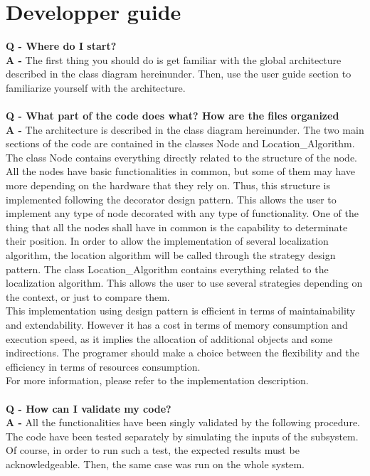 \documentclass[a4paper,10pt]{article}
\begin{document}
\section{Developper guide}
\textbf{Q - Where do I start?} \\
\textbf{A - }The first thing you should do is get familiar with the global architecture described in the class diagram hereinunder. Then, use the 
user guide section to familiarize yourself with the architecture.
\\ \\
\textbf{Q - What part of the code does what? How are the files organized} \\
\textbf{A - }The architecture is described in the class diagram hereinunder. The two main sections of the code are contained in the classes Node and 
Location\_Algorithm. \\
The class Node contains everything directly related to the structure of the node. All the nodes have basic functionalities in common, but
some of them may have more depending on the hardware that they rely on. Thus, this structure is implemented following the decorator design pattern. 
This allows the user to implement any type of node decorated with any type of functionality. One of the thing that all the nodes shall have in
common is the capability to determinate their position. In order to allow the implementation of several localization algorithm, the location algorithm
will be called through the strategy design pattern. The class Location\_Algorithm contains everything related to the localization algorithm. This
allows the user to use several strategies depending on the context, or just to compare them.\\
This implementation using design pattern is efficient in terms of maintainability and extendability. However it has a cost in terms of memory 
consumption and execution speed, as it implies the allocation of additional objects and some indirections. The programer should make a choice
between the flexibility and the efficiency in terms of resources consumption.	\\
For more information, please refer to the implementation description.
\\ \\
\textbf{Q - How can I validate my code?} \\
\textbf{A - }All the functionalities have been singly validated by the following procedure. The code have been tested separately by simulating the inputs of the 
subsystem. Of course, in order to run such a test, the expected results must be acknowledgeable. Then, the same case was run on the whole system.\\
\end{document}
